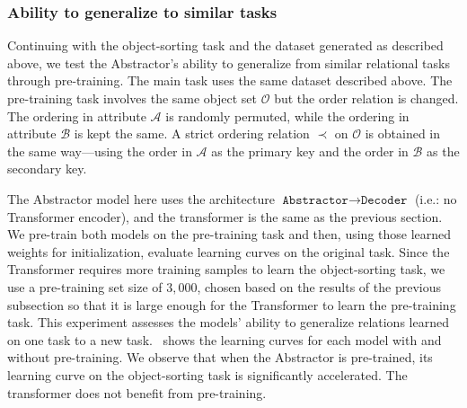 \subsubsection{Ability to generalize to similar tasks}\label{sssec:exp_object_sorting_generalization}

Continuing with the object-sorting task and the dataset generated as described above, we test the Abstractor's ability to generalize from similar relational tasks through pre-training. The main task uses the same dataset described above. The pre-training task involves the same object set $\mathcal{O}$ but the order relation is changed. The ordering in attribute $\mathcal{A}$ is randomly permuted, while the ordering in attribute $\mathcal{B}$ is kept the same. A strict ordering relation $\prec$ on $\mathcal{O}$ is obtained in the same way---using the order in $\mathcal{A}$ as the primary key and the order in $\mathcal{B}$ as the secondary key.

The Abstractor model here uses the architecture $\texttt{Abstractor} \to \texttt{Decoder}$ (i.e.: no Transformer
encoder), and the transformer is the same as the previous section. We pre-train both models on the pre-training task
and then, using those learned weights for initialization, evaluate learning curves on the original task. Since the
Transformer requires more training samples to learn the object-sorting task, we use a pre-training set size of $3,000$, chosen based on the results of the previous subsection so that it is large enough for the Transformer to learn the pre-training task. This experiment assesses the models' ability to generalize relations learned on one task to a new task.~ shows the learning curves for each model with and without pre-training. We observe that when the Abstractor is pre-trained, its learning curve on the object-sorting task is significantly accelerated. The transformer does not benefit from pre-training.
